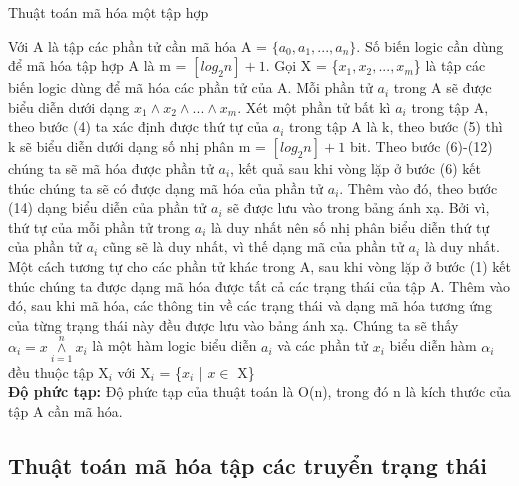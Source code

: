 \documentclass[a4paper,13pt,oneside,openany]{book}
\newenvironment{megaalgorithm}[1][htb]
{\renewcommand{\algorithmcfname}{Thuật toán}%
	\begin{algorithm}[#1]%
}{\end{algorithm}}
\begin{document}
\begin{flushleft}
\begin{megaalgorithm}[H]
			\caption{Thuật toán mã hóa một tập hợp}
		\end{megaalgorithm}
		Với A là tập các phần tử cần mã hóa A = $\{a_0, a_1, ..., a_n\}$. Số biến logic cần dùng để mã hóa tập hợp A là m = $[log_{2}n] + 1$. Gọi X = \{$x_{1}, x_{2}, ..., x_{m}$\} là tập các biến logic dùng để mã hóa các phần tử của A. Mỗi phần tử $a_i$ trong A sẽ được biểu diễn dưới dạng $x_{1}\land x_{2}\land...\land x_{m}$. Xét một phần tử bất kì $a_i$ trong tập A, theo bước (4) ta xác định được thứ tự của $a_i$ trong tập A là k, theo bước (5) thì k sẽ biểu diễn dưới dạng số nhị phân m = $[log_{2}n] + 1$ bit. Theo bước (6)-(12) chúng ta sẽ mã hóa được phần tử $a_i$, kết quả sau khi vòng lặp ở bước (6) kết thúc chúng ta sẽ có được dạng mã hóa của phần tử $a_i$. Thêm vào đó, theo bước (14) dạng biểu diễn của phần tử $a_i$ sẽ được lưu vào trong bảng ánh xạ. Bởi vì, thứ tự của mỗi phần tử trong $a_i$ là duy nhất nên số nhị phân biểu diễn thứ tự của phần tử $a_i$ cũng sẽ là duy nhất, vì thế dạng mã của phần tử $a_i$ là duy nhất. Một cách tương tự cho các phần tử khác trong A, sau khi vòng lặp ở bước (1) kết thúc chúng ta được dạng mã hóa được tất cả các trạng thái của tập A. Thêm vào đó, sau khi mã hóa, các thông tin về các trạng thái và dạng mã hóa tương ứng của từng trạng thái này đều được lưu vào bảng ánh xạ.
		Chúng ta sẽ thấy $\alpha_i = x \overset{n}{\underset{i=1}{\land}} x_i$ là một hàm logic biểu diễn $a_i$ và các phần tử $x_i$ biểu diễn hàm $\alpha_i$ đều thuộc tập $\textrm{X}_i$ với $\textrm{X}_i$ = \{$x_i$ | $x \in$ X\}\\
		\textbf{Độ phức tạp:} Độ phức tạp của thuật toán là O(n), trong đó n là kích thước của tập A cần mã hóa.\\	
				
		\subsection{Thuật toán mã hóa tập các truyển trạng thái}
		\begin{megaalgorithm}[H]
			\SetAlgoLined
			\DontPrintSemicolon
				

\end{megaalgorithm}
\end{flushleft}
\end{document}
